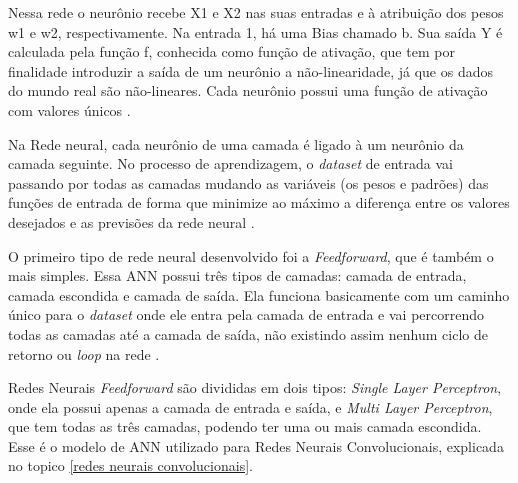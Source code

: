 \begin{figure}[H]
	\centering
\end{figure}

Nessa rede o neurônio recebe X1 e X2 nas suas entradas e à atribuição dos pesos w1 e w2, respectivamente. Na entrada 1, há uma Bias chamado b. Sua saída Y é calculada pela função f, conhecida como função de ativação, que tem por finalidade introduzir a saída de um neurônio a não-linearidade, já que os dados do mundo real são não-lineares. Cada neurônio possui uma função de ativação com valores únicos \cite{conv2}.

Na Rede neural, cada neurônio de uma camada é ligado à um neurônio da camada seguinte. No processo de aprendizagem, o \textit{dataset} de entrada vai passando por todas as camadas mudando as variáveis (os pesos e padrões) das funções de entrada de forma que minimize ao máximo a diferença entre os valores desejados e as previsões da rede neural \cite{redeneuralnvidia}.

O primeiro tipo de rede neural desenvolvido foi a \textit{Feedforward}, que é também o mais simples. Essa ANN possui três tipos de camadas: camada de entrada, camada escondida e camada de saída. Ela funciona basicamente com um caminho único para o \textit{dataset} onde ele entra pela camada de entrada e vai percorrendo todas as camadas até a camada de saída, não existindo assim nenhum ciclo de retorno ou \textit{loop} na rede \cite{conv2, redeneuralnvidia}.

Redes Neurais \textit{Feedforward} são divididas em dois tipos: \textit{Single Layer Perceptron}, onde ela possui apenas a camada de entrada e saída, e \textit{Multi Layer Perceptron}, que tem todas as três camadas, podendo ter uma ou mais camada escondida. Esse é o modelo de ANN utilizado para Redes Neurais Convolucionais, explicada no topico \ref{redes neurais convolucionais}.

